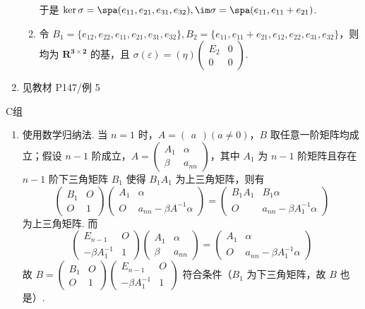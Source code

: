 \begin{enumerate}
\begin{enumerate}
                    于是 $\ker\sigma = \spa (e_{11},e_{21},e_{31},e_{32}),\im\sigma = \spa (e_{11},e_{11}+e_{21})$.

              \item 令 $B_1=\{e_{12},e_{22},e_{11},e_{21},e_{31},e_{32}\},B_2=\{e_{11},e_{11}+e_{21},e_{12},e_{22},e_{31},e_{32}\}$，则均为 $\mathbf{R^{3\times 2}}$ 的基，且 $\sigma(\varepsilon)=(\eta)\begin{pmatrix}E_2 & 0 \\ 0 & 0\end{pmatrix}$.
          \end{enumerate}

    \item 见教材 P147/例 5
\end{enumerate}

\centerline{\heiti C组}
\begin{enumerate}
    \item 使用数学归纳法. 当 $n=1$ 时，$A=\begin{pmatrix}a\end{pmatrix}(a\neq 0)$，$B$ 取任意一阶矩阵均成立；假设 $n-1$ 阶成立，$A = \begin{pmatrix}A_1 & \alpha \\ \beta & a_{nn}\end{pmatrix}$，其中 $A_1$ 为 $n-1$ 阶矩阵且存在 $n-1$ 阶下三角矩阵 $B_1$ 使得 $B_1A_1$ 为上三角矩阵，则有
          \[\begin{pmatrix}B_1 & O \\ O & 1\end{pmatrix}\begin{pmatrix}A_1 & \alpha \\ O & a_{nn}-\beta A^{-1}\alpha\end{pmatrix} = \begin{pmatrix}B_1A_1 & B_1\alpha \\ O & a_{nn}-\beta A_1^{-1}\alpha\end{pmatrix}\]为上三角矩阵.
          而 \[\begin{pmatrix}E_{n-1} & O \\ -\beta A_1^{-1} & 1\end{pmatrix}\begin{pmatrix}A_1 & \alpha \\ \beta & a_{nn}\end{pmatrix}=\begin{pmatrix}A_1 & \alpha \\ O & a_{nn}-\beta A_1^{-1} \alpha\end{pmatrix}\]
          故 $B=\begin{pmatrix}B_1 & O \\ O & 1\end{pmatrix}\begin{pmatrix}E_{n-1} & O \\ -\beta A_1^{-1} & 1\end{pmatrix}$ 符合条件（$B_1$ 为下三角矩阵，故 $B$ 也是）.


\end{enumerate}
